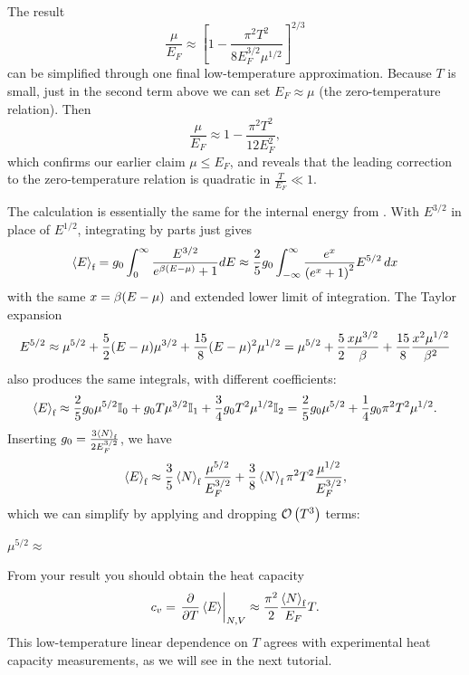 The result
\begin{equation*}
  \frac{\mu}{E_F} \approx \left[1 - \frac{\pi^2 T^2}{8 E_F^{3 / 2} \mu^{1 / 2}}\right]^{2 / 3}
\end{equation*}
can be simplified through one final low-temperature approximation.
Because $T$ is small, just in the second term above we can set $E_F \approx \mu$ (the zero-temperature relation).
Then
\begin{equation}
  \label{eq:mu_vs_T}
  \frac{\mu}{E_F} \approx 1 - \frac{\pi^2 T^2}{12 E_F^2},
\end{equation}
which confirms our earlier claim $\mu \leq E_F$, and reveals that the leading correction to the zero-temperature relation is quadratic in $\frac{T}{E_F} \ll 1$.

The calculation is essentially the same for the internal energy from .
With $E^{3 / 2}$ in place of $E^{1 / 2}$, integrating by parts just gives
\begin{equation*}
  \left\langle E \right\rangle_{\text{f}} = g_0 \int_0^{\infty} \frac{E^{3 / 2}}{e^{\beta(E - \mu)} + 1} dE \approx \frac{2}{5} g_0 \int_{-\infty}^{\infty} \frac{e^x}{\left(e^x + 1\right)^2} E^{5 / 2} \mathop{dx}
\end{equation*}
with the same $x = \beta(E - \mu)$ and extended lower limit of integration.
The Taylor expansion
\begin{equation*}
  E^{5 / 2} \approx \mu^{5 / 2} + \frac{5}{2} (E - \mu) \mu^{3 / 2} + \frac{15}{8} (E - \mu)^2 \mu^{1 / 2} = \mu^{5 / 2} + \frac{5}{2} \frac{x \mu^{3 / 2}}{\beta} + \frac{15}{8} \frac{x^2 \mu^{1 / 2}}{\beta^2}
\end{equation*}
also produces the same integrals, with different coefficients:
\begin{equation*}
  \left\langle E \right\rangle_{\text{f}} \approx \frac{2}{5} g_0 \mu^{5 / 2} \mathbb I_0 + g_0 T \mu^{3 / 2} \mathbb I_1 + \frac{3}{4} g_0 T^2 \mu^{1 / 2} \mathbb I_2 = \frac{2}{5} g_0 \mu^{5 / 2} + \frac{1}{4} g_0 \pi^2 T^2 \mu^{1 / 2}.
\end{equation*}
Inserting $g_0 = \frac{3\left\langle N \right\rangle_{\text{f}}}{2E_F^{3 / 2}}$, we have
\begin{equation*}
  \left\langle E \right\rangle_{\text{f}} \approx \frac{3}{5} \left\langle N \right\rangle_{\text{f}} \frac{\mu^{5 / 2}}{E_F^{3 / 2}} + \frac{3}{8} \left\langle N \right\rangle_{\text{f}} \pi^2 T^2 \frac{\mu^{1 / 2}}{E_F^{3 / 2}},
\end{equation*}
which we can simplify by applying  and dropping $\mathcal O\left(T^3\right)$ terms:
\begin{mdframed}
  $\displaystyle \mu^{5 / 2} \approx $ \\[100 pt]
\end{mdframed}
From your result you should obtain the heat capacity
\begin{equation*}
  c_v = \left. \frac{\partial }{\partial T} \left\langle E \right\rangle \right|_{N,V} \approx \frac{\pi^2}{2} \frac{\left\langle N \right\rangle_{\text{f}}}{E_F} T.
\end{equation*}
This low-temperature linear dependence on $T$ agrees with experimental heat capacity measurements, as we will see in the next tutorial.

